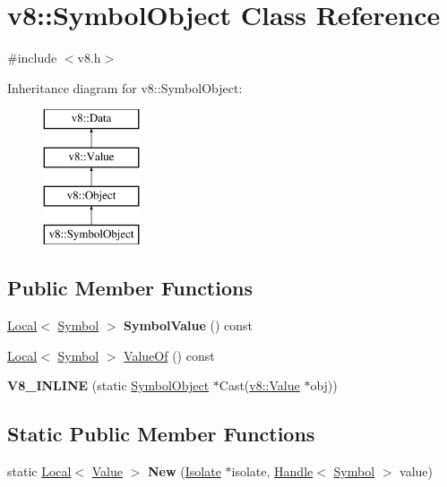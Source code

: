 \hypertarget{classv8_1_1_symbol_object}{}\section{v8\+:\+:Symbol\+Object Class Reference}
\label{classv8_1_1_symbol_object}


{\ttfamily \#include $<$v8.\+h$>$}

Inheritance diagram for v8\+:\+:Symbol\+Object\+:\begin{figure}[H]
\begin{center}
\leavevmode
\includegraphics[height=4.000000cm]{classv8_1_1_symbol_object}
\end{center}
\end{figure}
\subsection*{Public Member Functions}
\begin{DoxyCompactItemize}
\item 
\hypertarget{classv8_1_1_symbol_object_abae1f1d54533c784d2665bbb5b20f5b4}{}\hyperlink{classv8_1_1_local}{Local}$<$ \hyperlink{classv8_1_1_symbol}{Symbol} $>$ {\bfseries Symbol\+Value} () const \label{classv8_1_1_symbol_object_abae1f1d54533c784d2665bbb5b20f5b4}

\item 
\hyperlink{classv8_1_1_local}{Local}$<$ \hyperlink{classv8_1_1_symbol}{Symbol} $>$ \hyperlink{classv8_1_1_symbol_object_a4a3b439c6784a4a8d9bdc5a246e12b85}{Value\+Of} () const 
\item 
\hypertarget{classv8_1_1_symbol_object_a6eed92b3b2b6abdbaa37b59ed50549ae}{}{\bfseries V8\+\_\+\+I\+N\+L\+I\+N\+E} (static \hyperlink{classv8_1_1_symbol_object}{Symbol\+Object} $\ast$Cast(\hyperlink{classv8_1_1_value}{v8\+::\+Value} $\ast$obj))\label{classv8_1_1_symbol_object_a6eed92b3b2b6abdbaa37b59ed50549ae}

\end{DoxyCompactItemize}
\subsection*{Static Public Member Functions}
\begin{DoxyCompactItemize}
\item 
\hypertarget{classv8_1_1_symbol_object_a74dfdb8fdd78b14f860e3b20dc7bdc9d}{}static \hyperlink{classv8_1_1_local}{Local}$<$ \hyperlink{classv8_1_1_value}{Value} $>$ {\bfseries New} (\hyperlink{classv8_1_1_isolate}{Isolate} $\ast$isolate, \hyperlink{classv8_1_1_handle}{Handle}$<$ \hyperlink{classv8_1_1_symbol}{Symbol} $>$ value)\label{classv8_1_1_symbol_object_a74dfdb8fdd78b14f860e3b20dc7bdc9d}

\end{DoxyCompactItemize}


